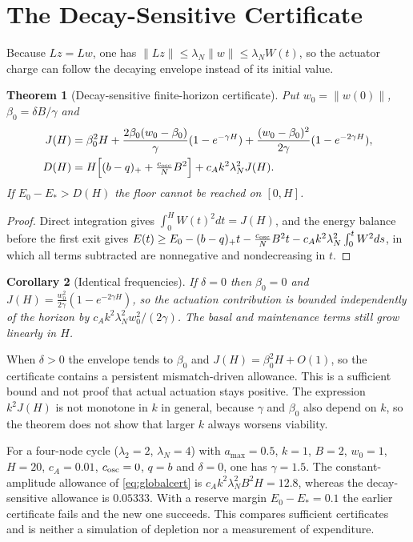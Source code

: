 \documentclass[11pt,notitlepage]{report}
\newtheorem{theorem}{Theorem}[chapter]
\newtheorem{corollary}[theorem]{Corollary}
\theoremstyle{definition}
\theoremstyle{remark}
\begin{document}
\section{The Decay-Sensitive Certificate}
Because $Lz=Lw$, one has $\|Lz\|\le\lambda_N\|w\|\le\lambda_NW(t)$, so the actuator charge can follow the decaying envelope instead of its initial value.
\begin{theorem}[Decay-sensitive finite-horizon certificate]\label{th:decay}
Put $w_0=\|w(0)\|$, $\beta_0=\delta B/\gamma$ and
\begin{align}
J(H)&=\beta_0^2H+\frac{2\beta_0(w_0-\beta_0)}{\gamma}(1-e^{-\gamma H})+\frac{(w_0-\beta_0)^2}{2\gamma}(1-e^{-2\gamma H}),\\
D(H)&=H\Bigl[(b-q)_++\tfrac{c_{\rm osc}}NB^2\Bigr]+c_Ak^2\lambda_N^2J(H).
\end{align}
If $E_0-E_*>D(H)$ the floor cannot be reached on $[0,H]$.
\end{theorem}
\begin{proof}
Direct integration gives $\int_0^HW(t)^2dt=J(H)$, and the energy balance before the first exit gives $E(t)\ge E_0-(b-q)_+t-\tfrac{c_{\rm osc}}NB^2t-c_Ak^2\lambda_N^2\int_0^tW^2ds$, in which all terms subtracted are nonnegative and nondecreasing in $t$.
\end{proof}
\begin{corollary}[Identical frequencies]\label{cor:identical}
If $\delta=0$ then $\beta_0=0$ and $J(H)=\tfrac{w_0^2}{2\gamma}(1-e^{-2\gamma H})$, so the actuation contribution is bounded independently of the horizon by $c_Ak^2\lambda_N^2w_0^2/(2\gamma)$. The basal and maintenance terms still grow linearly in $H$.
\end{corollary}
When $\delta>0$ the envelope tends to $\beta_0$ and $J(H)=\beta_0^2H+O(1)$, so the certificate contains a persistent mismatch-driven allowance. This is a sufficient bound and not proof that actual actuation stays positive. The expression $k^2J(H)$ is not monotone in $k$ in general, because $\gamma$ and $\beta_0$ also depend on $k$, so the theorem does not show that larger $k$ always worsens viability.

For a four-node cycle ($\lambda_2=2$, $\lambda_N=4$) with $a_{\max}=0.5$, $k=1$, $B=2$, $w_0=1$, $H=20$, $c_A=0.01$, $c_{\rm osc}=0$, $q=b$ and $\delta=0$, one has $\gamma=1.5$. The constant-amplitude allowance of \eqref{eq:globalcert} is $c_Ak^2\lambda_N^2B^2H=12.8$, whereas the decay-sensitive allowance is $0.05333$. With a reserve margin $E_0-E_*=0.1$ the earlier certificate fails and the new one succeeds. This compares sufficient certificates and is neither a simulation of depletion nor a measurement of expenditure.
\end{document}
